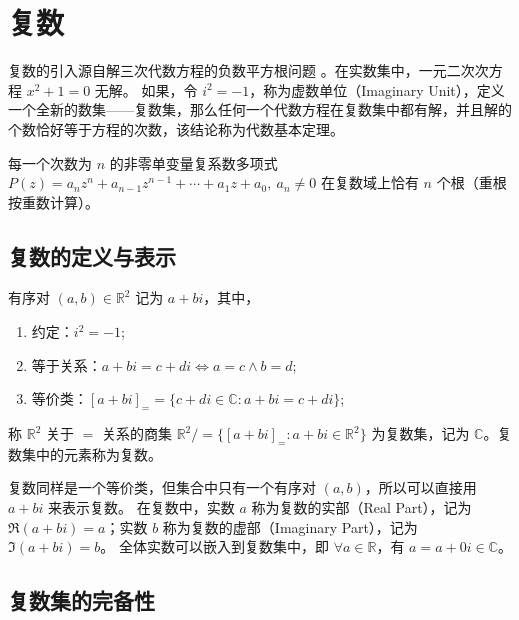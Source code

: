 \section{复数}
复数的引入源自解三次代数方程的负数平方根问题 。在实数集中，一元二次次方程 $x^2 + 1 = 0$ 无解。
如果，令 $i^2=-1$，称为虚数单位（Imaginary Unit），定义一个全新的数集——复数集，那么任何一个代数方程在复数集中都有解，并且解的个数恰好等于方程的次数，该结论称为代数基本定理。

\begin{theorem}
    每一个次数为 $n$ 的非零单变量复系数多项式 $P(z)=a_nz^n + a_{n-1}z^{n-1} + \cdots + a_1z + a_0,\ a_n\neq 0$ 在复数域上恰有 $n$ 个根（重根按重数计算）。
\end{theorem}

\vspace{1em}

\subsection{复数的定义与表示}

\begin{definition} 有序对 $(a,b)\in\mathbb{R}^2$ 记为 $a+bi$，其中，
    \begin{enumerate}
        \item 约定：$i^2 = -1$;
        \item 等于关系：$a+bi = c+di \Leftrightarrow a=c \land b=d$;
        \item 等价类：$[a+bi]_{=} = \{c+di\in\mathbb{C} : a+bi = c+di\}$;
    \end{enumerate}
    称 $\mathbb{R}^2$ 关于 $=$ 关系的商集 $\mathbb{R}^2/= \{[a+bi]_{=} : a+bi\in\mathbb{R}^2\}$ 为复数集，记为 $\mathbb{C}$。复数集中的元素称为复数。
\end{definition}

\begin{note}
    复数同样是一个等价类，但集合中只有一个有序对 $(a,b)$，所以可以直接用 $a+bi$ 来表示复数。
    在复数中，实数 $a$ 称为复数的实部（Real Part），记为 $\Re(a+bi)=a$；实数 $b$ 称为复数的虚部（Imaginary Part），记为 $\Im(a+bi)=b$。
    全体实数可以嵌入到复数集中，即 $\forall a\in\mathbb{R}$，有 $a =a+0i \in \mathbb{C}$。
\end{note}

\vspace{1em}



\subsection{复数集的完备性}

\newpage